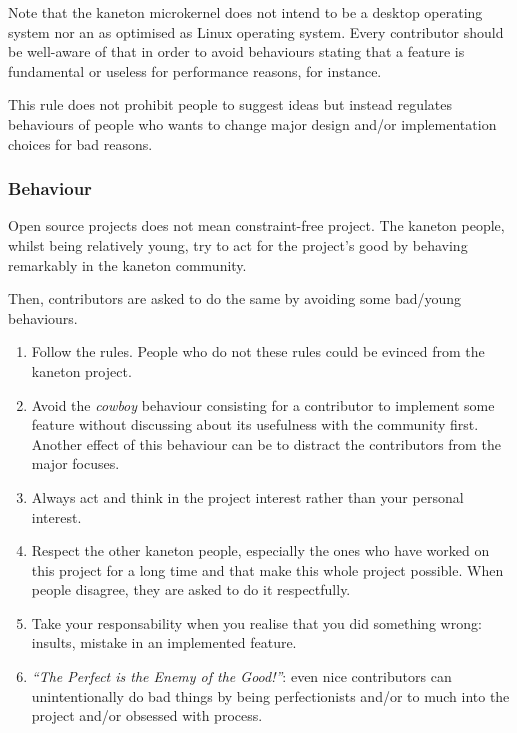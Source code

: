 Note that the kaneton microkernel does not intend to be a desktop operating
system nor an as optimised as Linux operating system. Every contributor should
be well-aware of that in order to avoid behaviours stating that a feature
is fundamental or useless for performance reasons, for instance.

This rule does not prohibit people to suggest ideas but instead regulates
behaviours of people who wants to change major design and/or implementation
choices for bad reasons.


\subsubsection{Behaviour}

Open source projects does not mean constraint-free project. The kaneton
people, whilst being relatively young, try to act for the project's good
by behaving remarkably in the kaneton community.

Then, contributors are asked to do the same by avoiding some bad/young
behaviours.

\begin{enumerate}
  \item
    Follow the rules. People who do not these rules could be evinced from
    the kaneton project.
  \item
    Avoid the \textit{cowboy} behaviour consisting for a contributor to
    implement some feature without discussing about its usefulness with the
    community first. Another effect of this behaviour can be to distract
    the contributors from the major focuses.
  \item
    Always act and think in the project interest rather than your personal
    interest.
  \item
    Respect the other kaneton people, especially the ones who have worked
    on this project for a long time and that make this whole project possible.
    When people disagree, they are asked to do it respectfully.
  \item
    Take your responsability when you realise that you did something wrong:
    insults, mistake in an implemented feature.
  \item
    \textit{``The Perfect is the Enemy of the Good!''}: even nice
    contributors can unintentionally do bad things by being perfectionists
    and/or to much into the project and/or obsessed with process.
\end{enumerate}

